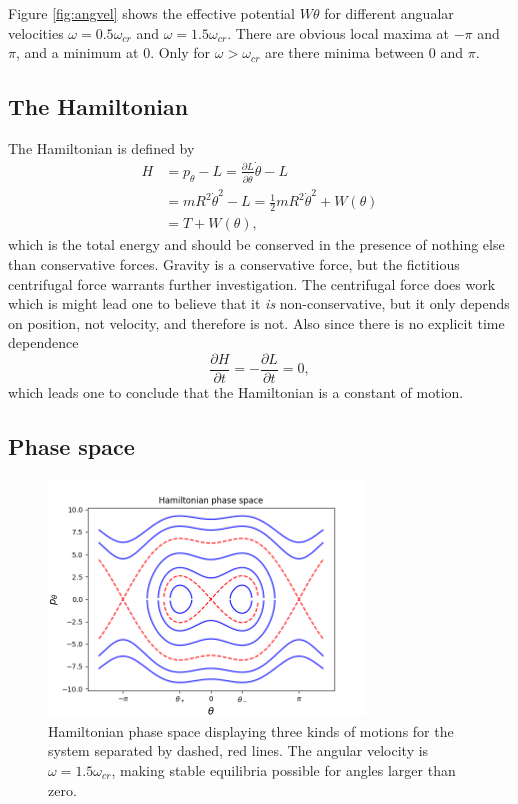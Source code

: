 \documentclass[11pt]{amsart}
\begin{document}
Figure \ref{fig:angvel} shows the effective potential $W{\theta}$ for different angualar velocities $\omega = 0.5\omega_{cr}$ and $\omega = 1.5\omega_{cr}$. There are obvious local maxima at $-\pi$ and $\pi$, and a minimum at $0$. Only for $\omega > \omega_{cr}$ are there minima between $0$ and $\pi$. 

\subsection{The Hamiltonian}
The Hamiltonian is defined by
\begin{align*}
H &= p_\theta - L = \frac{\partial L}{\partial \dot{\theta}}\dot{\theta} - L\\
  &= mR^2\dot{\theta}^2 - L = \frac{1}{2}mR^2\dot{\theta}^2 + W(\theta) \\
  &= T + W(\theta),
\end{align*}
which is the total energy and should be conserved in the presence of nothing else than conservative forces. Gravity is a conservative force, but the fictitious centrifugal force warrants further investigation. The centrifugal force does work which is might lead one to believe that it \emph{is} non-conservative, but it only depends on position, not velocity, and therefore is not. Also since there is no explicit time dependence
\begin{equation}
\frac{\partial H}{\partial t} = -\frac{\partial L}{\partial t} = 0,
\end{equation}
which leads one to conclude that the Hamiltonian is a constant of motion.

\subsection{Phase space}
\begin{figure}
\centering
	\includegraphics[width = 0.75\textwidth]{phase_space.png}
	\caption{Hamiltonian phase space displaying three kinds of motions for the system separated by dashed, red lines. The angular velocity is $\omega = 1.5\omega_{cr}$, making stable equilibria possible for angles larger than zero.}
	\label{fig:phasespace}
\end{figure}
\end{document}
